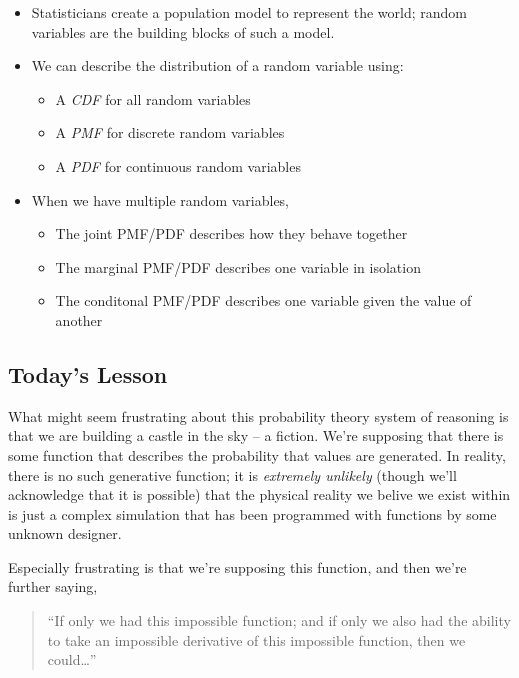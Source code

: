 \documentclass[
]{book}
\providecommand{\tightlist}{%
  \setlength{\itemsep}{0pt}\setlength{\parskip}{0pt}}
\theoremstyle{definition}
\theoremstyle{definition}
\theoremstyle{definition}
\theoremstyle{definition}
\theoremstyle{remark}
\begin{document}
\begin{itemize}
\tightlist
\item
  Statisticians create a population model to represent the world; random variables are the building blocks of such a model.
\item
  We can describe the distribution of a random variable using:

  \begin{itemize}
  \tightlist
  \item
    A \emph{CDF} for all random variables
  \item
    A \emph{PMF} for discrete random variables
  \item
    A \emph{PDF} for continuous random variables
  \end{itemize}
\item
  When we have multiple random variables,

  \begin{itemize}
  \tightlist
  \item
    The joint PMF/PDF describes how they behave together
  \item
    The marginal PMF/PDF describes one variable in isolation
  \item
    The conditonal PMF/PDF describes one variable given the value of another
  \end{itemize}
\end{itemize}

\hypertarget{todays-lesson}{%
\subsection{Today's Lesson}\label{todays-lesson}}

What might seem frustrating about this probability theory system of reasoning is that we are building a castle in the sky -- a fiction. We're supposing that there is some function that describes the probability that values are generated. In reality, there is no such generative function; it is \emph{extremely unlikely} (though we'll acknowledge that it is possible) that the physical reality we belive we exist within is just a complex simulation that has been programmed with functions by some unknown designer.

Especially frustrating is that we're supposing this function, and then we're further saying,

\begin{quote}
``If only we had this impossible function; and if only we also had the ability to take an impossible derivative of this impossible function, then we could\ldots{}''
\end{quote}
\end{document}
